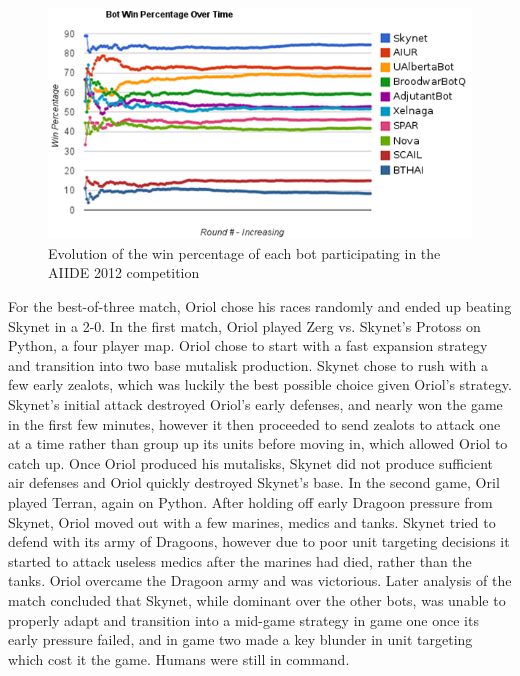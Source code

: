 \documentclass[journal]{IEEEtran}
\begin{document}
\begin{figure}[t!]
    \centering
    \includegraphics[width=\columnwidth]{figures/aiide2012_v2}
    \caption{Evolution of the win percentage of each bot participating in the AIIDE 2012 competition}
    \label{fig:aiide2012}
\end{figure}



For the best-of-three match, Oriol chose his races randomly and ended up beating Skynet in a 2-0. 
In the first match, Oriol played Zerg vs. Skynet's Protoss on Python, a four player map. Oriol chose
to start with a fast expansion strategy and transition into two base mutalisk production. Skynet chose
to rush with a few early zealots, which was luckily the best possible choice given Oriol's strategy.
Skynet's initial attack destroyed Oriol's early defenses, and nearly won the game in the first few
minutes, however it then proceeded to send zealots to attack one at a time rather than group up its
units before moving in, which allowed Oriol to catch up. Once Oriol produced his mutalisks, Skynet did
not produce sufficient air defenses and Oriol quickly destroyed Skynet's base. In the second game,
Oril played Terran, again on Python. After holding off early Dragoon pressure from Skynet, Oriol
moved out with a few marines, medics and tanks. Skynet tried to defend with its army of Dragoons,
however due to poor unit targeting decisions it started to attack useless medics after the marines
had died, rather than the tanks. Oriol overcame the Dragoon army and was victorious. Later analysis
of the match concluded that Skynet, while dominant over the other bots, was unable to properly
adapt and transition into a mid-game strategy in game one once its early pressure failed, and in game
two made a key blunder in unit targeting which cost it the game. Humans were still in command.
\end{document}
